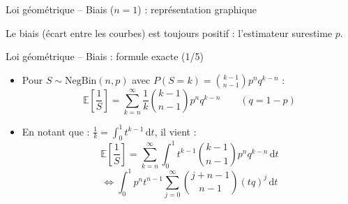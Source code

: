 \documentclass[11pt,aspectratio=169]{beamer}
\newcommand{\dd}{\mathrm{d}}
\begin{document}
\begin{frame}{Loi géométrique -- Biais ($n=1$) : représentation graphique}

\begin{center}
\end{center}

\vspace{-0.5em}
Le biais (écart entre les courbes) est toujours positif : l'estimateur surestime $p$.

\end{frame}

\begin{frame}{Loi géométrique -- Biais : formule exacte (1/5)}

  \begin{itemize}

  \item Pour $S \sim \text{NegBin}(n, p)$ avec $P(S=k) = \binom{k-1}{n-1} p^n q^{k-n}$ :
    \[
      \mathbb{E}\left[\frac{1}{S}\right] = \sum_{k=n}^{\infty} \frac{1}{k} \binom{k-1}{n-1} p^n q^{k-n} \qquad (q = 1-p)
    \]

    \medskip
    
  \item En notant que : $\displaystyle\frac{1}{k} = \int_0^1 t^{k-1} \, \dd t$, il vient :
    \[
      \mathbb{E}\left[\frac{1}{S}\right] = \sum_{k=n}^{\infty} \int_0^1 t^{k-1} \binom{k-1}{n-1} p^n q^{k-n} \, \dd t
    \]
    \[
      \Leftrightarrow \int_0^1 p^n t^{n-1} \sum_{j=0}^{\infty} \binom{j+n-1}{n-1} (tq)^{j} \, \dd t
    \]
      
  \end{itemize}

\end{frame}
\end{document}
